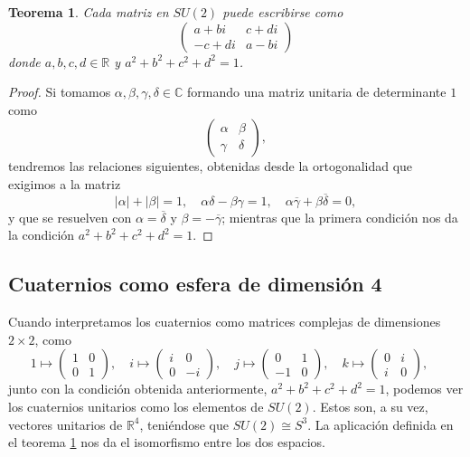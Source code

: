 \documentclass{article}
\theoremstyle{plain}
\newtheorem{theorem}{Teorema}
\theoremstyle{definition}
\theoremstyle{remark}
\begin{document}
\begin{theorem}\label{su2}
  Cada matriz en $SU(2)$ puede escribirse como
  \[\begin{pmatrix}
      a+bi & c+di \\
      -c+di & a-bi
    \end{pmatrix}\]
  donde $a,b,c,d \in \mathbb{R}$ y $a^2+b^2+c^2+d^2 = 1$.
\end{theorem}
\begin{proof}
  Si tomamos $\alpha,\beta,\gamma,\delta \in \mathbb{C}$ formando una matriz unitaria de
  determinante $1$ como
    \[\begin{pmatrix}
      \alpha & \beta \\
      \gamma & \delta
    \end{pmatrix},\]
  tendremos las relaciones siguientes, obtenidas desde la ortogonalidad que exigimos a la matriz
  \[|\alpha|+|\beta| = 1,
    \quad
    \alpha\delta-\beta\gamma = 1,
    \quad
    \alpha\overline{\gamma} + \beta\overline{\delta} = 0,
  \]
  y que se resuelven con $\alpha = \overline{\delta}$ y
  $\beta = -\overline{\gamma}$; mientras que la primera condición
  nos da la condición $a^2+b^2+c^2+d^2 = 1$.
\end{proof}


\subsection{Cuaternios como esfera de dimensión 4}
Cuando interpretamos los cuaternios como matrices complejas de dimensiones
$2 \times 2$, como
\[
  1 \mapsto \begin{pmatrix} 1 & 0 \\ 0 & 1 \end{pmatrix},\quad
  i \mapsto \begin{pmatrix} i & 0 \\ 0 &-i \end{pmatrix},\quad
  j \mapsto \begin{pmatrix} 0 & 1 \\-1 & 0 \end{pmatrix},\quad
  k \mapsto \begin{pmatrix} 0 & i \\ i & 0 \end{pmatrix},\quad
\]
junto con la condición obtenida anteriormente, $a^2+b^2+c^2+d^2 = 1$,
podemos ver los cuaternios unitarios como los elementos de $SU(2)$.
Estos son, a su vez, vectores unitarios de $\mathbb{R}^4$, teniéndose
que $SU(2) \cong S^3$. La aplicación definida
en el teorema \ref{su2} nos da el isomorfismo entre los dos espacios.
\end{document}
